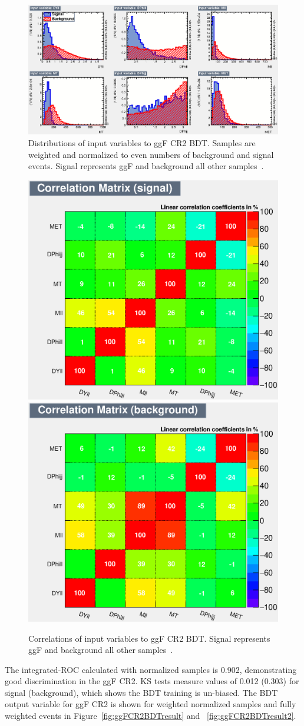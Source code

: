 \begin{figure}[!htbp]
    \centering
    \includegraphics[width=0.7\linewidth]{Pictures/ggFCR2/variables_id_c1.eps}
    \caption{Distributions of input variables to ggF CR2 BDT. Samples are weighted and normalized to even numbers of background and signal events. Signal represents ggF and background all other samples~\cite{ourSupportNote}.}
    \label{fig:ggFCR2BDTinput}
\end{figure}
\begin{figure}[!htbp]
\centering
  \includegraphics[width=.45\linewidth]{Pictures/ggFCR2/CorrelationMatrixS.eps}
  \includegraphics[width=.45\linewidth]{Pictures/ggFCR2/CorrelationMatrixB.eps}
\caption{Correlations of input variables to ggF CR2 BDT. Signal represents ggF and background all other samples~\cite{ourSupportNote}.}
\label{fig:ggFCR2corrSB}
\end{figure}

The integrated-ROC calculated with normalized samples is 0.902, demonstrating good discrimination in the ggF CR2. KS tests measure values of 0.012 (0.303) for signal (background), which shows the BDT training is un-biased. The BDT output variable for ggF CR2 is shown for weighted normalized samples and fully weighted events in Figure~\ref{fig:ggFCR2BDTresult} and ~\ref{fig:ggFCR2BDTresult2}. 

